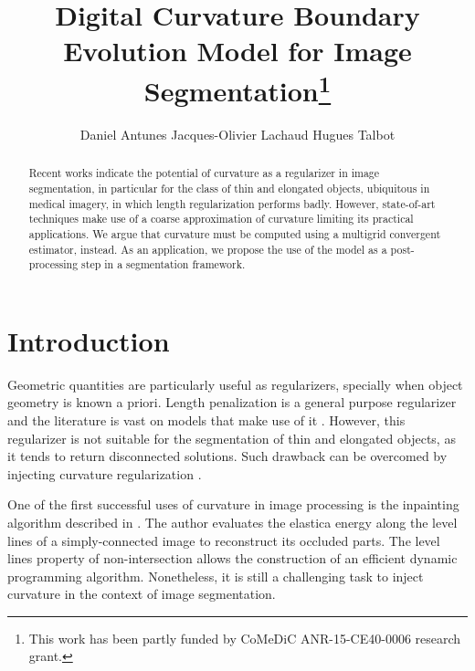 \documentclass[runningheads]{llncs}
\begin{document}
%
\title{Digital Curvature Boundary Evolution Model for Image Segmentation\thanks{This  work has  been  partly  funded by CoMeDiC ANR-15-CE40-0006 research grant.}}

\author{Daniel Antunes
Jacques-Olivier Lachaud
Hugues Talbot}
%
%
%
\maketitle              %
%
\begin{abstract}
Recent works indicate the potential of curvature as a regularizer in image segmentation, in particular for the class of thin and elongated objects, ubiquitous in medical imagery, in which length regularization performs badly. However, state-of-art techniques make use of a coarse approximation of curvature  limiting its practical applications. We argue that curvature must be computed using a multigrid convergent estimator, instead. As an application, we propose the use of the model as a post-processing step in a segmentation framework.
 
\end{abstract}
%
%
%

\section{Introduction}

Geometric quantities are particularly useful as regularizers, specially when object geometry is known a priori. Length penalization is a general purpose regularizer and the literature is vast on models that make use of it \cite{casseles97,appleton05}. However, this regularizer is not suitable for the segmentation of thin and elongated objects, as it tends to return disconnected solutions. Such drawback can be overcomed by injecting curvature regularization \cite{zehiry10}.
				
One of the first successful uses of curvature in image processing is the inpainting algorithm described in \cite{masnou98}. The author evaluates the elastica energy along the level lines of a simply-connected image to reconstruct its occluded parts. The level lines property of non-intersection allows the construction of an efficient dynamic programming algorithm. Nonetheless, it is still a challenging task to inject curvature in the context of image segmentation. 
\end{document}
